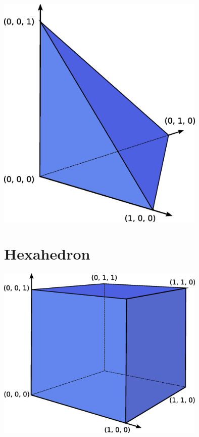 \includegraphics[width=10cm]{eps/tetrahedron.eps}

\newpage
\section{Hexahedron}

\includegraphics[width=10cm]{eps/hexahedron.eps}
